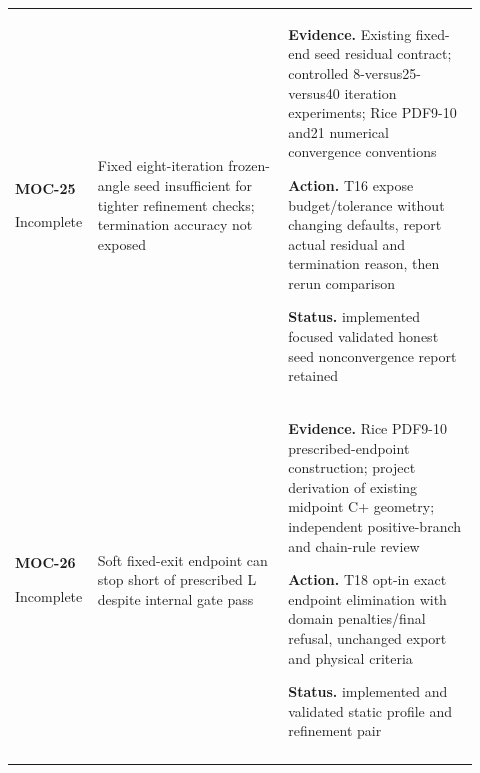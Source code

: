 \begin{longtable}{@{}P{0.12\linewidth}P{0.40\linewidth}P{0.40\linewidth}@{}}
\textbf{MOC-25}\par Incomplete & Fixed eight-iteration frozen-angle seed insufficient for tighter refinement checks; termination accuracy not exposed\par {}\par {}\par {} & \textbf{Evidence.} Existing fixed-end seed residual contract; controlled 8-versus25-versus40 iteration experiments; Rice PDF9-10 and21 numerical convergence conventions\par \textbf{Action.} T16 expose budget/tolerance without changing defaults, report actual residual and termination reason, then rerun comparison\par \textbf{Status.} implemented focused validated honest seed nonconvergence report retained\\ \addlinespace[5pt]
\textbf{MOC-26}\par Incomplete & Soft fixed-exit endpoint can stop short of prescribed L despite internal gate pass\par {}\par {}\par {} & \textbf{Evidence.} Rice PDF9-10 prescribed-endpoint construction; project derivation of existing midpoint C+ geometry; independent positive-branch and chain-rule review\par \textbf{Action.} T18 opt-in exact endpoint elimination with domain penalties/final refusal, unchanged export and physical criteria\par \textbf{Status.} implemented and validated static profile and refinement pair\\ \addlinespace[5pt]
\bottomrule
\end{longtable}
\endgroup
